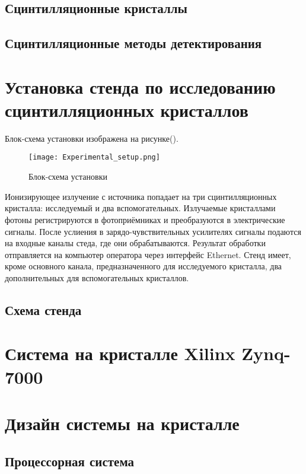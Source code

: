 \documentclass[a4paper, 14pt]{extarticle}
\begin{document}
    \subsection{Сцинтилляционные кристаллы}
    
    \subsection{Сцинтилляционные методы детектирования}
    

\section{Установка стенда по исследованию сцинтилляционных кристаллов}
    Блок-схема установки изображена на рисунке().\par
    \begin{figure}[ht]
        \centering
        \texttt{[image: Experimental\_setup.png]}
        \caption{Блок-схема установки}
        \label{fig:mpr}
    \end{figure}
    Ионизирующее излучение с источника попадает на три сцинтилляционных кристалла: исследуемый и два вспомогательных. Излучаемые кристаллами фотоны регистрируются в фотоприёмниках и преобразуются в электрические сигналы. После услиения в зарядо-чувствительных усилителях сигналы подаются на входные каналы стеда, где они обрабатываются. Результат обработки отправляется на компьютер оператора через интерфейс Ethernet. Стенд имеет, кроме основного канала, предназначенного для исследуемого кристалла, два дополнительных для вспомогательных кристаллов.
    
    \subsection{Схема стенда}
    

\section{Система на кристалле Xilinx Zynq-7000}
    
    
\section{Дизайн системы на кристалле}
    \subsection{Процессорная система}
    
\end{document}
